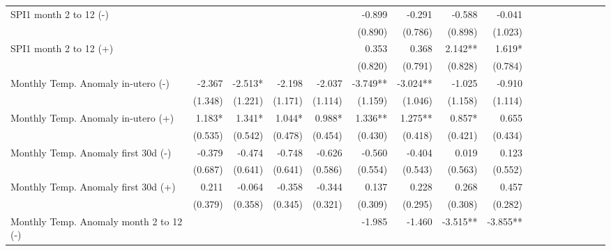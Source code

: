 \begin{table}[H]
\begin{adjustbox}{max width=\linewidth}
\begin{tabular}{lrrrrrrrrrrrrrrrr}
SPI1 month 2 to 12  (-)                      &             &             &           &             &        -0.899 &       -0.291  &     -0.588 &       -0.041 \\
                                             &             &             &           &             &       (0.890) &      (0.786)  &    (0.898) &      (1.023) \\
SPI1 month 2 to 12  (+)                      &             &             &           &             &         0.353 &        0.368  &    2.142** &       1.619* \\
                                             &             &             &           &             &       (0.820) &      (0.791)  &    (0.828) &      (0.784) \\
Monthly Temp. Anomaly in-utero   (-)         &      -2.367 &     -2.513* &    -2.198 &      -2.037 &      -3.749** &     -3.024**  &     -1.025 &       -0.910 \\
                                             &     (1.348) &     (1.221) &   (1.171) &     (1.114) &       (1.159) &      (1.046)  &    (1.158) &      (1.114) \\
Monthly Temp. Anomaly in-utero  (+)          &      1.183* &      1.341* &    1.044* &      0.988* &       1.336** &      1.275**  &     0.857* &        0.655 \\
                                             &     (0.535) &     (0.542) &   (0.478) &     (0.454) &       (0.430) &      (0.418)  &    (0.421) &      (0.434) \\
Monthly Temp. Anomaly first 30d   (-)        &      -0.379 &      -0.474 &    -0.748 &      -0.626 &        -0.560 &       -0.404  &      0.019 &        0.123 \\
                                             &     (0.687) &     (0.641) &   (0.641) &     (0.586) &       (0.554) &      (0.543)  &    (0.563) &      (0.552) \\
Monthly Temp. Anomaly first 30d (+)          &       0.211 &      -0.064 &    -0.358 &      -0.344 &         0.137 &        0.228  &      0.268 &        0.457 \\
                                             &     (0.379) &     (0.358) &   (0.345) &     (0.321) &       (0.309) &      (0.295)  &    (0.308) &      (0.282) \\
Monthly Temp. Anomaly month 2 to 12 (-)      &             &             &           &             &        -1.985 &       -1.460  &   -3.515** &     -3.855** \\

\end{tabular}
\end{adjustbox}
\end{table}
